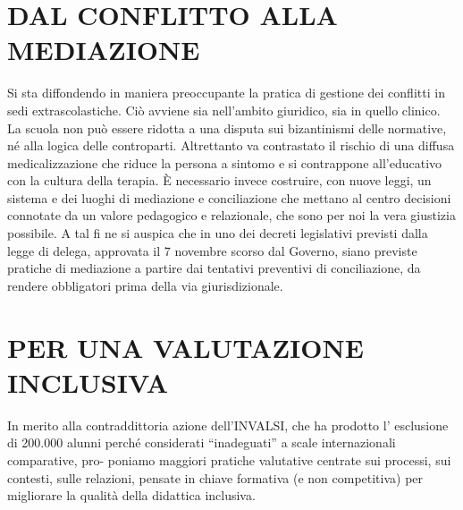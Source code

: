 \section*{DAL CONFLITTO ALLA MEDIAZIONE}
Si sta diffondendo in maniera preoccupante la pratica di gestione dei conflitti in sedi
extrascolastiche. Ciò avviene sia nell'ambito giuridico, sia in quello clinico. La scuola
non può essere ridotta a una disputa sui bizantinismi delle normative, né alla logica
delle controparti. Altrettanto va contrastato il rischio di una diffusa medicalizzazione che
riduce la persona a sintomo e si contrappone all'educativo con la cultura della terapia.
È necessario invece costruire, con nuove leggi, un sistema e dei luoghi di mediazione
e conciliazione che mettano al centro decisioni connotate da un valore pedagogico e
relazionale, che sono per noi la vera giustizia possibile. A tal fi ne si auspica che in uno
dei decreti legislativi previsti dalla legge di delega, approvata il 7 novembre scorso dal
Governo, siano previste pratiche di mediazione a partire dai tentativi preventivi di conciliazione, da rendere obbligatori prima della via giurisdizionale.
\section*{PER UNA VALUTAZIONE INCLUSIVA}
In merito alla contraddittoria azione dell'INVALSI, che ha prodotto l’ esclusione di
200.000 alunni perché considerati “inadeguati” a scale internazionali comparative, pro-
poniamo maggiori pratiche valutative centrate sui processi, sui contesti, sulle relazioni,
pensate in chiave formativa (e non competitiva) per migliorare la qualità della didattica
inclusiva.
